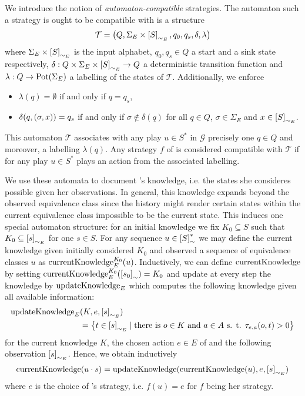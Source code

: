We introduce the notion of \emph{automaton-compatible} strategies. The 
automaton such a strategy is ought to be compatible with is a structure
\begin{equation*}
  \mathcal{T} = \left(Q, \Sigma_{E}\times \left[S\right]_{\sim_{E}}, q_{0}, 
  q_{s}, \delta, \lambda\right)
\end{equation*}
where $\Sigma_{E}\times \left[S\right]_{\sim_{E}}$ is the input alphabet, 
$q_{0}, q_{s}\in Q$ a start and a sink state respectively, 
$\delta:Q\times \Sigma_{E}\times \left[S\right]_{\sim_{E}}\rightarrow Q$ a 
deterministic transition function and $\lambda:Q\rightarrow\operatorname{Pot}(\Sigma_{E})$ a
labelling of the states of $\mathcal{T}$. Additionally, we enforce
\begin{itemize}
  \item $\lambda(q) = \emptyset$ if and only if $q = q_{s}$,
  \item $\delta(q, \left(\sigma, x\right)) = q_{s}$ if and only if 
    $\sigma\not\in\delta(q)$ for all $q\in Q$, $\sigma\in\Sigma_{E}$ and 
    $x\in\left[S\right]_{\sim_{E}}$.
\end{itemize}
This automaton $\mathcal{T}$ associates with any play $u\in S^{*}$ in 
$\mathcal{G}$ precisely one $q\in Q$ and moreover, a labelling $\lambda(q)$. 
Any strategy $f$ of \eve{} is considered compatible with $\mathcal{T}$ if for 
any play $u\in S^{*}$ \eve{} plays an action from the associated labelling.

We use these automata to document \eve{}'s knowledge, i.e. the states she 
consideres possible given her observations. In general, this knowledge expands
beyond the observed equivalence class since the history might render certain 
states within the current equivalence class impossible to be the current state.
This induces one special automaton structure: for an initial knowledge we fix
$K_{0}\subseteq S$ such that $K_{0}\subseteq\left[s\right]_{\sim_{E}}$ for one 
$s\in S$. For any sequence $u\in \left[S\right]_{\sim}^{*}$ we may define the
current knowledge given \eve{} initially considered $K_{0}$ and observed a 
sequence of equivalence classes $u$ as $\operatorname{currentKnowledge}^{K_{0}}_{E}(u)$. Inductively, we
can define $\operatorname{currentKnowledge}$ by setting 
$\operatorname{currentKnowledge}^{K_{0}}_{E}(\left[s_{0}\right]_{\sim}) = K_{0}$ and update at every step
the knowledge by $\operatorname{updateKnowledge}_{E}$ which computes the following knowledge given all
available information: 
\begin{align*}
  \operatorname{updateKnowledge}_{E}&(K, e, \left[s\right]_{\sim_{E}})\\
  &= \left\{
    t\in\left[s\right]_{\sim_{E}}\mid \text{there is }o\in K\text{ and }a\in A
    \text{ s. t. }\tau_{e,a}(o, t) > 0
  \right\}
\end{align*}
for the current knowledge $K$, the chosen action $e\in E$ of \eve{} and the 
following observation $\left[s\right]_{\sim_{E}}$. Hence, we obtain inductively
\begin{equation*}
  \operatorname{currentKnowledge}(u\cdot s) = \operatorname{updateKnowledge}(\operatorname{currentKnowledge}(u), e, \left[s\right]_{\sim_{E}})
\end{equation*} where $e$ is the choice of \eve{}'s strategy, i.e. $f(u) = e$ 
for $f$ being her strategy.
